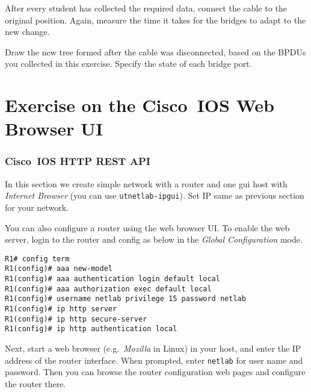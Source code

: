 \documentclass{../UTNetLab}
\begin{document}
    After every student has collected the required data, connect the cable to the original position. Again, measure the time it takes for the bridges to adapt to the new change.
    
    \begin{report}
    \item Draw the new tree formed after the cable was disconnected, based on the BPDUs you collected in this exercise. Specify the state of each bridge port.
    \end{report}

\part{Exercise on the Cisco~IOS Web Browser UI}
\section{Cisco~IOS HTTP REST API}
    In this section we create simple network with a router and one gui host with \textit{Internet Browser} (you can use \texttt{utnetlab-ipgui}). Set IP same as previous section for your network.

    You can also configure a router using the web browser UI. To enable the web server, login to the router and config as below  in the \textit{Global Configuration} mode. 

    \begin{lstlisting}[language={cisco},emph={netlab}]
R1# config term
R1(config)# aaa new-model
R1(config)# aaa authentication login default local
R1(config)# aaa authorization exec default local
R1(config)# username netlab privilege 15 password netlab
R1(config)# ip http server
R1(config)# ip http secure-server
R1(config)# ip http authentication local
    \end{lstlisting}
    
    Next, start a web browser (e.g.\ \textit{Mozilla} in Linux) in your host, and enter the IP address of the router interface. When prompted, enter \texttt{netlab} for user name and password. Then you can browse the router configuration web pages and configure the router there.
\end{document}
